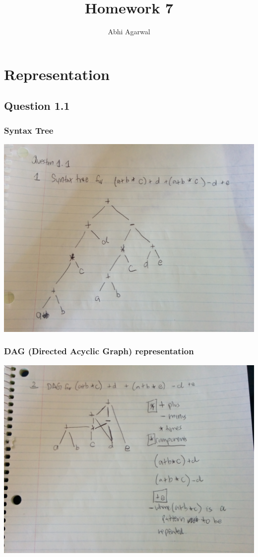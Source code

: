 \documentclass[11pt, oneside]{article}   	%
\title{Homework 7}
\author{Abhi Agarwal}
\date{}
\begin{document}
\maketitle

\section{Representation}

\subsection{Question 1.1}

\subsubsection{Syntax Tree}
\includegraphics[scale=0.12]{IMG_20141025_154037.jpg}

\subsubsection{DAG (Directed Acyclic Graph) representation}
\includegraphics[scale=0.12]{IMG_20141025_154052.jpg}
\end{document}
